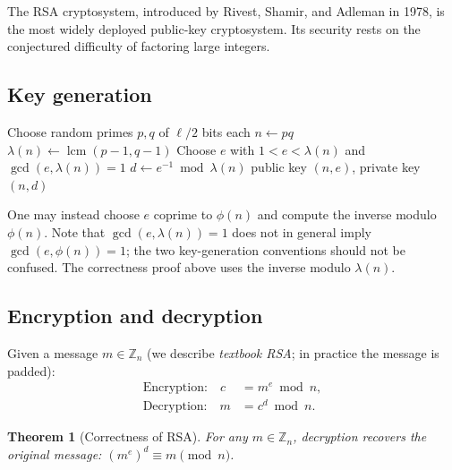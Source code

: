 \documentclass[twoside,12pt]{book}
\theoremstyle{plain}
\newtheorem{theorem}{Theorem}[chapter]
\theoremstyle{definition}
\theoremstyle{remark}
\begin{document}
The RSA cryptosystem, introduced by Rivest, Shamir, and Adleman in 1978, is the most widely deployed public-key cryptosystem. Its security rests on the conjectured difficulty of factoring large integers.

\subsection{Key generation}

\begin{algorithm}
\caption{RSA Key Generation}
\label{alg:rsa-keygen}
\begin{algorithmic}[1]
 
    \State Choose random primes $p, q$ of $\ell/2$ bits each
    \State $n \gets pq$ 
    \State $\lambda(n) \gets \operatorname{lcm}(p-1, q-1)$
    \State Choose $e$ with $1 < e < \lambda(n)$ and $\gcd(e, \lambda(n)) = 1$
    \State $d \gets e^{-1} \bmod \lambda(n)$ 
    \State \Return public key $(n, e)$, private key $(n, d)$
\EndFunction
\end{algorithmic}
\end{algorithm}

One may instead choose $e$ coprime to $\phi(n)$ and compute the inverse
modulo $\phi(n)$. Note that $\gcd(e,\lambda(n))=1$ does not in general imply
$\gcd(e,\phi(n))=1$; the two key-generation conventions should not be
confused. The correctness proof above uses the inverse modulo $\lambda(n)$.

\subsection{Encryption and decryption}

Given a message $m \in \mathbb{Z}_n$ (we describe \emph{textbook RSA}; in practice the message is padded):
\begin{align*}
\text{Encryption:} \quad c &= m^e \bmod n, \\
\text{Decryption:} \quad m &= c^d \bmod n.
\end{align*}

\begin{theorem}[Correctness of RSA]
\label{thm:rsa-correctness}
For any $m \in \mathbb{Z}_n$, decryption recovers the original message: $(m^e)^d \equiv m \pmod{n}$.
\end{theorem}
\end{document}
